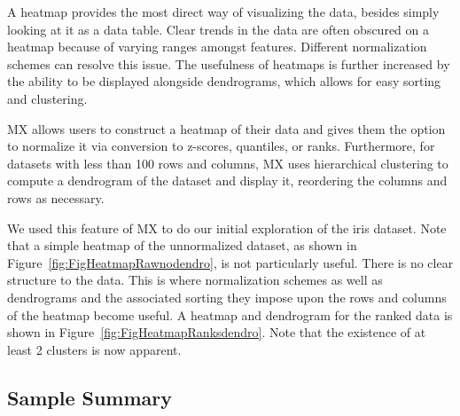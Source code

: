 \documentclass[twoside,leqno,twocolumn]{article}
\begin{document}
A heatmap provides the most direct way of visualizing the data, besides simply looking at it as a data table. Clear trends in the data are often obscured on a heatmap because of varying ranges amongst features. Different normalization schemes can resolve this issue. The usefulness of heatmaps is further increased by the ability to be displayed alongside dendrograms, which allows for easy sorting and clustering.

MX allows users to construct a heatmap of their data and gives them the option to normalize it via conversion to z-scores, quantiles, or ranks. Furthermore, for datasets with less than 100 rows and columns, MX uses hierarchical clustering to compute a dendrogram of the dataset and display it, reordering the columns and rows as necessary. 

We used this feature of MX to do our initial exploration of the iris dataset. Note that a simple heatmap of the unnormalized dataset, as shown in Figure~\ref{fig:FigHeatmapRawnodendro}, is not particularly useful. There is no clear structure to the data. This is where normalization schemes as well as dendrograms and the associated sorting they impose upon the rows and columns of the heatmap become useful. A heatmap and dendrogram for the ranked data is shown in Figure~\ref{fig:FigHeatmapRanksdendro}. Note that the existence of at least 2 clusters is now apparent.

\subsection{Sample Summary}
\label{subsec:SubSecSample}
\end{document}
